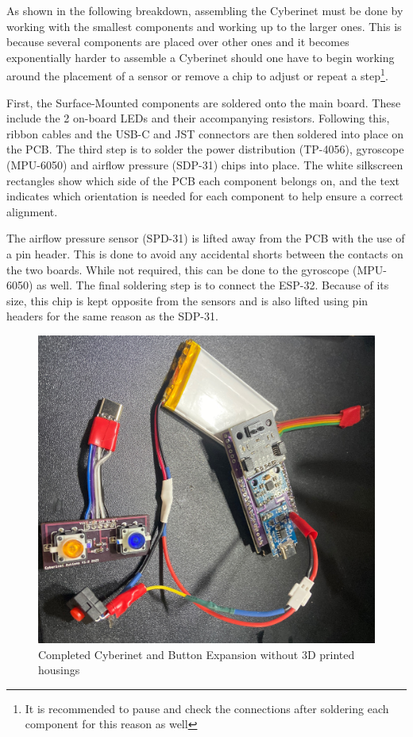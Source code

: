 As shown in the following breakdown, assembling the Cyberinet must be done by working with the smallest components and working up to the larger ones. This is because several components are placed over other ones and it becomes exponentially harder to assemble a Cyberinet should one have to begin working around the placement of a sensor or remove a chip to adjust or repeat a step\footnote{It is recommended to pause and check the connections after soldering each component for this reason as well}.

First, the Surface-Mounted components are soldered onto the main board. These include the 2 on-board LEDs and their accompanying resistors. Following this, ribbon cables and the USB-C and JST connectors are then soldered into place on the PCB. The third step is to solder the power distribution (TP-4056), gyroscope (MPU-6050) and airflow pressure (SDP-31) chips into place. The white silkscreen rectangles show which side of the PCB each component belongs on, and the text indicates which orientation is needed for each component to help ensure a correct alignment.

The airflow pressure sensor (SPD-31) is lifted away from the PCB with the use of a pin header. This is done to avoid any accidental shorts between the contacts on the two boards. While not required, this can be done to the gyroscope (MPU-6050) as well. The final soldering step is to connect the ESP-32. Because of its size, this chip is kept opposite from the sensors and is also lifted using pin headers for the same reason as the SDP-31.

\begin{center}
    \begin{figure}
        \centering
        \includegraphics[scale=0.1]{diagrams/builtUnits/noCase.JPG}
        \caption{Completed Cyberinet and Button Expansion without 3D printed housings}
        \label{fig:CyberinetNoCase}
    \end{figure}
\end{center}

